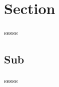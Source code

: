 \documentclass{article}
\begin{document}
\tableofcontents
\newpage

\section{Section}

sssss

\subsection{Sub}

sssss
\end{document}
